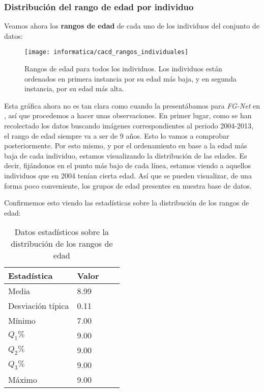 \subsubsection{Distribución del rango de edad por individuo}

Veamos ahora los \textbf{rangos de edad} de cada uno de los individuos del conjunto de datos:

\begin{figure}[H]
    \centering
    \texttt{[image: informatica/cacd\_rangos\_individuales]}
    \caption{Rangos de edad para todos los individuos. Los individuos están ordenados en primera instancia por su edad más baja, y en segunda instancia, por su edad más alta.}
\end{figure}

Esta gráfica ahora no es tan clara como cuando la presentábamos para \textit{FG-Net} en , así que procedemos a hacer unas observaciones. En primer lugar, como se han recolectado los datos buscando imágenes correspondientes al periodo 2004-2013, el rango de edad siempre va a ser de 9 años. Esto lo vamos a comprobar posteriormente. Por esto mismo, y por el ordenamiento en base a la edad más baja de cada individuo, estamos visualizando la distribución de las edades. Es decir, fijándonos en el punto más bajo de cada línea, estamos viendo a aquellos individuos que en 2004 tenían cierta edad. Así que se pueden visualizar, de una forma poco conveniente, los grupos de edad presentes en nuestra base de datos.

Confirmemos esto viendo las estadísticas sobre la distribución de los rangos de edad:

\begin{table}[H]
\centering
\begin{tabular}{|l|l|l|l|}
    \hline
    \textbf{Estadística} & \textbf{Valor} \\
    \hline

    Media             & 8.99 \\
    Desviación típica & 0.11 \\
    Mínimo            & 7.00 \\
    $Q_1 \%$          & 9.00 \\
    $Q_2 \%$          & 9.00 \\
    $Q_3 \%$          & 9.00 \\
    Máximo            & 9.00 \\

    \hline

\end{tabular}
    \caption{Datos estadísticos sobre la distribución de los rangos de edad}
\end{table}

